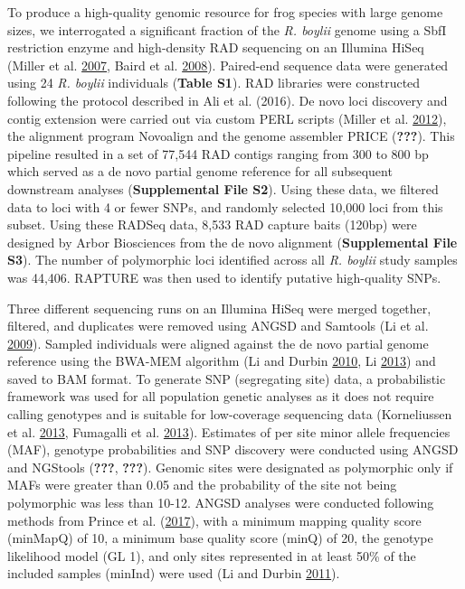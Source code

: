 \documentclass[proquest,12pt,final]{ucthesis-CA2012} %
\begin{document}
\begin{ucmainmatter}
To produce a high-quality genomic resource for frog species with large
genome sizes, we interrogated a significant fraction of the \emph{R.
boylii} genome using a SbfI restriction enzyme and high-density RAD
sequencing on an Illumina HiSeq (Miller et al.
\protect\hyperlink{ref-miller_rapid_2007}{2007}, Baird et al.
\protect\hyperlink{ref-baird_rapid_2008}{2008}). Paired-end sequence
data were generated using 24 \emph{R. boylii} individuals (\textbf{Table
S1}). RAD libraries were constructed following the protocol described in
Ali et al. (2016). De novo loci discovery and contig extension were
carried out via custom PERL scripts (Miller et al.
\protect\hyperlink{ref-miller_conserved_2012}{2012}), the alignment
program Novoalign and the genome assembler PRICE ({\textbf{???}}). This
pipeline resulted in a set of 77,544 RAD contigs ranging from 300 to 800
bp which served as a de novo partial genome reference for all subsequent
downstream analyses (\textbf{Supplemental File S2}). Using these data,
we filtered data to loci with 4 or fewer SNPs, and randomly selected
10,000 loci from this subset. Using these RADSeq data, 8,533 RAD capture
baits (120bp) were designed by Arbor Biosciences from the de novo
alignment (\textbf{Supplemental File S3}). The number of polymorphic
loci identified across all \emph{R. boylii} study samples was 44,406.
RAPTURE was then used to identify putative high-quality SNPs.

Three different sequencing runs on an Illumina HiSeq were merged
together, filtered, and duplicates were removed using ANGSD and Samtools
(Li et al. \protect\hyperlink{ref-li_sequence_2009}{2009}). Sampled
individuals were aligned against the de novo partial genome reference
using the BWA-MEM algorithm (Li and Durbin
\protect\hyperlink{ref-li_fast_2010}{2010}, Li
\protect\hyperlink{ref-li_aligning_2013}{2013}) and saved to BAM format.
To generate SNP (segregating site) data, a probabilistic framework was
used for all population genetic analyses as it does not require calling
genotypes and is suitable for low-coverage sequencing data (Korneliussen
et al. \protect\hyperlink{ref-korneliussen_calculation_2013}{2013},
Fumagalli et al.
\protect\hyperlink{ref-fumagalli_quantifying_2013}{2013}). Estimates of
per site minor allele frequencies (MAF), genotype probabilities and SNP
discovery were conducted using ANGSD and NGStools ({\textbf{???}},
{\textbf{???}}). Genomic sites were designated as polymorphic only if
MAFs were greater than 0.05 and the probability of the site not being
polymorphic was less than 10-12. ANGSD analyses were conducted following
methods from Prince et al.
(\protect\hyperlink{ref-prince_evolutionary_2017}{2017}), with a minimum
mapping quality score (minMapQ) of 10, a minimum base quality score
(minQ) of 20, the genotype likelihood model (GL 1), and only sites
represented in at least 50\% of the included samples (minInd) were used
(Li and Durbin \protect\hyperlink{ref-li_inference_2011}{2011}).


\end{ucmainmatter}
\end{document}
